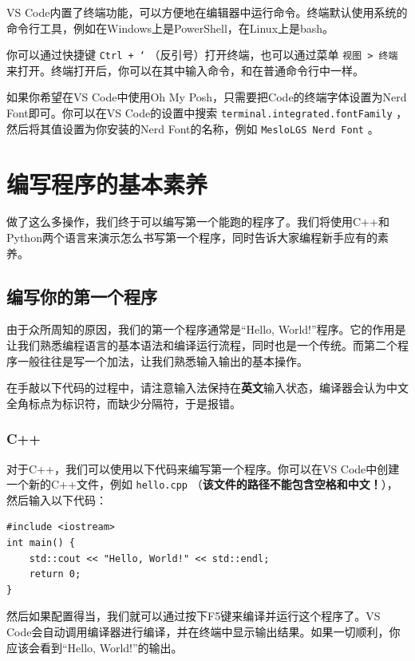 VS Code内置了终端功能，可以方便地在编辑器中运行命令。终端默认使用系统的命令行工具，例如在Windows上是PowerShell，在Linux上是bash。

你可以通过快捷键 \texttt{Ctrl + `} （反引号）打开终端，也可以通过菜单 \texttt{视图 > 终端} 来打开。终端打开后，你可以在其中输入命令，和在普通命令行中一样。

如果你希望在VS Code中使用Oh My Posh，只需要把Code的终端字体设置为Nerd Font即可。你可以在VS Code的设置中搜索 \texttt{terminal.integrated.fontFamily} ，然后将其值设置为你安装的Nerd Font的名称，例如 \texttt{MesloLGS Nerd Font} 。

\section{编写程序的基本素养}

做了这么多操作，我们终于可以编写第一个能跑的程序了。我们将使用C++和Python两个语言来演示怎么书写第一个程序，同时告诉大家编程新手应有的素养。

\subsection{编写你的第一个程序}

由于众所周知的原因，我们的第一个程序通常是“Hello, World!”程序。它的作用是让我们熟悉编程语言的基本语法和编译运行流程，同时也是一个传统。而第二个程序一般往往是写一个加法，让我们熟悉输入输出的基本操作。

\begin{note}
在手敲以下代码的过程中，请注意输入法保持在\textbf{英文}输入状态，编译器会认为中文全角标点为标识符，而缺少分隔符，于是报错。
\end{note}

\subsubsection{C++}

对于C++，我们可以使用以下代码来编写第一个程序。你可以在VS Code中创建一个新的C++文件，例如 \texttt{hello.cpp} （\textbf{该文件的路径不能包含空格和中文！}），然后输入以下代码：

\begin{verbatim}
#include <iostream>
int main() {
    std::cout << "Hello, World!" << std::endl;
    return 0;
}
\end{verbatim}

然后如果配置得当，我们就可以通过按下F5键来编译并运行这个程序了。VS Code会自动调用编译器进行编译，并在终端中显示输出结果。如果一切顺利，你应该会看到“Hello, World!”的输出。

